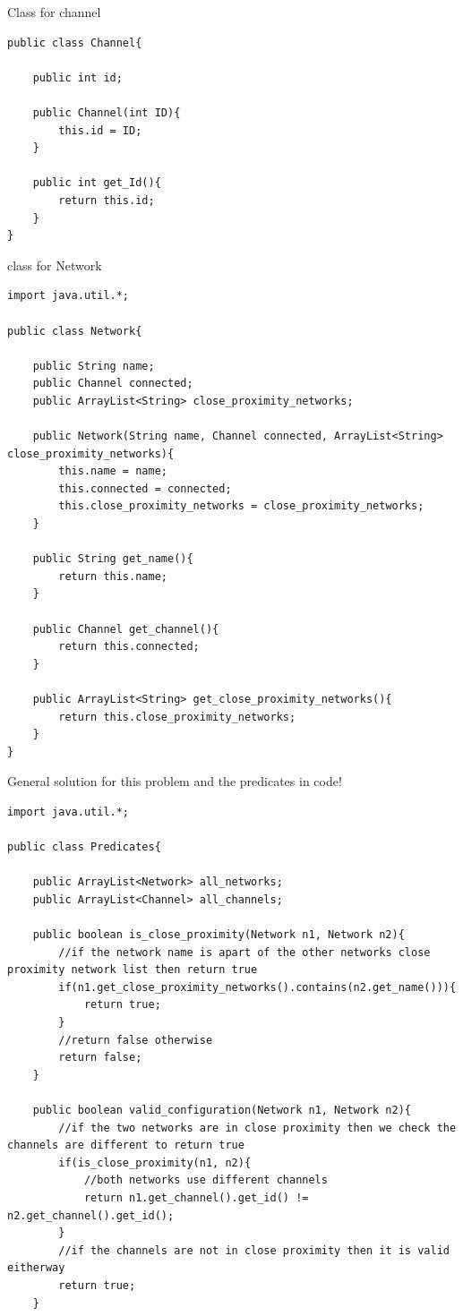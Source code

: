 \documentclass{article}
\begin{document}
\begin{enumerate}[(a)]
\begin{enumerate}[(i)]
            \newpage
            Class for channel
            \begin{lstlisting}
public class Channel{

    public int id;
    
    public Channel(int ID){
        this.id = ID;
    }
    
    public int get_Id(){
        return this.id;
    }
}
            \end{lstlisting}
            
            class for Network
            \begin{lstlisting}
import java.util.*;

public class Network{

    public String name;
    public Channel connected;
    public ArrayList<String> close_proximity_networks;
    
    public Network(String name, Channel connected, ArrayList<String> close_proximity_networks){
        this.name = name;
        this.connected = connected;
        this.close_proximity_networks = close_proximity_networks;
    }
    
    public String get_name(){
        return this.name;
    }
    
    public Channel get_channel(){
        return this.connected;
    }
    
    public ArrayList<String> get_close_proximity_networks(){
        return this.close_proximity_networks;
    }
}
            \end{lstlisting}
            
            \newpage
            General solution for this problem and the predicates in code!
            \begin{lstlisting}
import java.util.*;

public class Predicates{

    public ArrayList<Network> all_networks;
    public ArrayList<Channel> all_channels;
    
    public boolean is_close_proximity(Network n1, Network n2){
        //if the network name is apart of the other networks close proximity network list then return true
        if(n1.get_close_proximity_networks().contains(n2.get_name())){
            return true;
        }
        //return false otherwise
        return false;
    }
    
    public boolean valid_configuration(Network n1, Network n2){
        //if the two networks are in close proximity then we check the channels are different to return true
        if(is_close_proximity(n1, n2){
            //both networks use different channels
            return n1.get_channel().get_id() != n2.get_channel().get_id();
        }
        //if the channels are not in close proximity then it is valid eitherway
        return true;
    }
    

\end{lstlisting}
\end{enumerate}
\end{enumerate}
\end{document}
